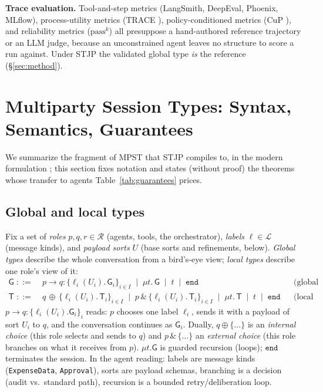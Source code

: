 \documentclass{article}
\newcommand{\gtG}{\mathsf{G}}
\newcommand{\lt}{\mathsf{T}}
\newcommand{\ed}{\mathtt{end}}
\newcommand{\sends}{\rightarrow}
\newcommand{\lbl}{\ell}
\newcommand{\stjp}{\textsc{STJP}}
\begin{document}
\textbf{Trace evaluation.} Tool-and-step metrics (LangSmith, DeepEval, Phoenix, MLflow), process-utility metrics (TRACE \citep{trace}), policy-conditioned metrics (CuP \citep{stweb}), and reliability metrics ($\mathrm{pass}^k$) all presuppose a hand-authored reference trajectory or an LLM judge, because an unconstrained agent leaves no structure to score a run against. Under \stjp{} the validated global type \emph{is} the reference (\S\ref{sec:method}).

\section{Multiparty Session Types: Syntax, Semantics, Guarantees}\label{sec:mpst}
We summarize the fragment of MPST that \stjp{} compiles to, in the modern formulation \citep{hyc08,scalas19}; this section fixes notation and states (without proof) the theorems whose transfer to agents Table~\ref{tab:guarantees} prices.

\subsection{Global and local types}
Fix a set of \emph{roles} $p,q,r\in\mathcal{R}$ (agents, tools, the orchestrator), \emph{labels} $\lbl\in\mathcal{L}$ (message kinds), and \emph{payload sorts} $U$ (base sorts and refinements, below). \emph{Global types} describe the whole conversation from a bird's-eye view; \emph{local types} describe one role's view of it:
\begin{align*}
\gtG \;::=\;& p \sends q : \{\lbl_i(U_i).\,\gtG_i\}_{i\in I} \;\mid\; \mu t.\,\gtG \;\mid\; t \;\mid\; \ed
&& \text{(global types)}\\
\lt \;::=\;& q\,{\oplus}\,\{\lbl_i(U_i).\,\lt_i\}_{i\in I} \;\mid\; p\,\&\,\{\lbl_i(U_i).\,\lt_i\}_{i\in I} \;\mid\; \mu t.\,\lt \;\mid\; t \;\mid\; \ed
&& \text{(local types)}
\end{align*}
$p \sends q:\{\lbl_i(U_i).\gtG_i\}_{i}$ reads: $p$ chooses one label $\lbl_i$, sends it with a payload of sort $U_i$ to $q$, and the conversation continues as $\gtG_i$. Dually, $q\oplus\{\ldots\}$ is an \emph{internal choice} (this role selects and sends to $q$) and $p\,\&\,\{\ldots\}$ an \emph{external choice} (this role branches on what it receives from $p$). $\mu t.\gtG$ is guarded recursion (loops); $\ed$ terminates the session. In the agent reading: labels are message kinds (\texttt{ExpenseData}, \texttt{Approval}), sorts are payload schemas, branching is a decision (audit vs.\ standard path), recursion is a bounded retry/deliberation loop.
\end{document}

